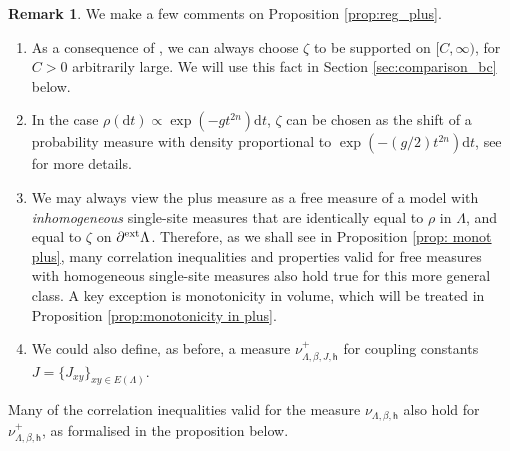 \documentclass[11pt,a4paper]{article}
\numberwithin{equation}{section}
\theoremstyle{plain}
\theoremstyle{definition}
\newtheorem{Rem}[Thm]{Remark}
\begin{document}
\begin{Rem}\label{rem:plus}
We make a few comments on Proposition \ref{prop:reg_plus}.
\begin{enumerate}
    \item[$(i)$] As a consequence of \cite[Remark 6.12]{PV26}, we can always choose $\zeta$ to be supported on $[C,\infty)$, for $C>0$ arbitrarily large. We will use this fact in Section \ref{sec:comparison_bc} below. 
    \item[$(ii)$] In the case $\rho(\mathrm{d}t)\propto \exp(-gt^{2n})\mathrm{d}t$, $\zeta$ can be chosen as the shift of a probability measure with density proportional to $\exp(-(g/2)t^{2n})\mathrm{d}t$, see \cite[Remark~6.13]{PV26} for more details.
    \item[$(iii)$] We may always view the plus measure as a free measure of a model with \emph{inhomogeneous} single-site measures that are identically equal to $\rho$ in $\Lambda$, and equal to $\zeta$ on $\partial^{\textup{ext}}\Lambda$. Therefore, as we shall see in Proposition \ref{prop: monot plus}, many correlation inequalities and properties valid for free measures with homogeneous single-site measures also hold true for this more general class. A key exception is monotonicity in volume, which will be treated in Proposition \ref{prop:monotonicity in plus}.
    \item[$(iv)$] We could also define, as before, a measure $\nu^+_{\Lambda,\beta,J,\mathsf{h}}$ for coupling constants $J=\{J_{xy}\}_{xy\in E(\Lambda)}$. 
\end{enumerate}
\end{Rem}


Many of the correlation inequalities valid for the measure $\nu_{\Lambda,\beta,\mathsf{h}}$ also hold for $\nu_{\Lambda,\beta,\mathsf{h}}^+$, as formalised in the proposition below.
\end{document}
